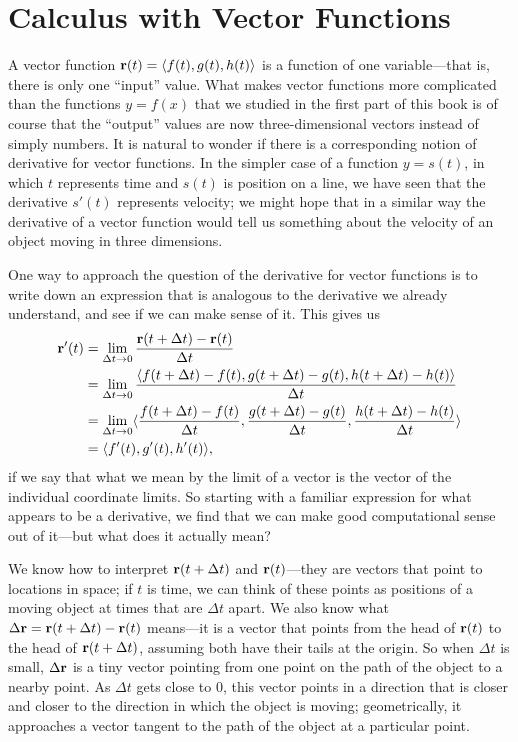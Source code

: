 \section{Calculus with Vector Functions}\label{sec:calculus with vector functions}

A vector function ${\bf r}(t)=\langle f(t),g(t),h(t)\rangle$ is a
function of one variable---that is, there is only one ``input''
value. What makes vector functions more complicated than the functions
$y=f(x)$ that we studied in the first part of this book is of course
that the ``output'' values are now three-dimensional vectors instead
of simply numbers. It is natural to wonder if there is a corresponding
notion of derivative for vector functions. In the simpler case of a
function $y=s(t)$, in which $t$ represents time and $s(t)$ is position
on a line, we have seen that the derivative $s'(t)$ represents
velocity; we might hope that in a similar way the derivative of a
vector function would tell us something about the velocity of an
object moving in three dimensions.

One way to approach the question of the derivative for vector
functions is to write down an expression that is analogous to the
derivative we already understand, and see if we can make sense of
it. This gives us
\begin{align*}
  {\bf r}'(t)&=\lim_{\Delta t\to0}{{\bf r}(t+\Delta t)-{\bf r}(t)\over
  \Delta t}	\\
  &=\lim_{\Delta t\to0}{\langle f(t+\Delta t)-f(t),g(t+\Delta t)-g(t),
  h(t+\Delta t)-h(t)\rangle\over \Delta t}	\\
  &=\lim_{\Delta t\to0}\langle {f(t+\Delta t)-f(t)\over\Delta t},
  {g(t+\Delta t)-g(t)\over\Delta t},
  {h(t+\Delta t)-h(t)\over \Delta t}\rangle	\\
  &=\langle f'(t),g'(t),h'(t)\rangle,
\end{align*}
if we say that what we mean by the limit of a vector is the vector of
the individual coordinate limits. So starting with a familiar
expression for what appears to be a derivative, we find that we can
make good computational sense out of it---but what does it actually
mean?

We know how to interpret ${\bf r}(t+\Delta t)$ and ${\bf r}(t)$---they
are vectors that point to locations in space; if $t$ is time, we can
think of these points as positions of a moving object at times that
are $\Delta t$ apart. We also know what $\Delta {\bf r}=
{\bf r}(t+\Delta t)-{\bf r}(t)$
means---it is a vector that points from the head of ${\bf r}(t)$ to
the head of ${\bf r}(t+\Delta t)$, assuming both have their tails at
the origin. So when $\Delta t$ is small, 
$\Delta {\bf r}$ is a tiny vector pointing from one
point on the path of the object to a nearby point. As $\Delta t$ gets
close to 0, this vector points in a direction that is closer and
closer to the direction in which the object is moving; geometrically,
it approaches a vector tangent to the path of the object at a
particular point.


